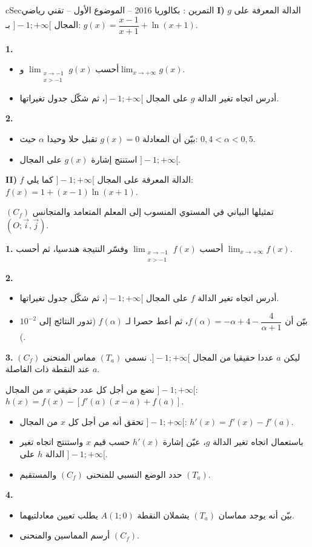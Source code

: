 \documentclass[12pt,a4paper]{article}
\newenvironment{BOX}[2]{\begin{otherlanguage}{english}\begin{arbox}{#1}{#2}}{\end{arbox}\end{otherlanguage}}
\newcounter{exo}
\newenvironment{tamrin}[1]{\stepcounter{exo}\begin{BOX}{cSec}{التمرين \theexo: #1}}{\end{BOX}}
\newenvironment{sq}{\begin{itemize}[leftmargin=2.4em,itemsep=3pt]}{\end{itemize}}
\newcommand{\qa}{\item[(أ)]}\newcommand{\qb}{\item[(ب)]}\newcommand{\qc}{\item[(جـ)]}\newcommand{\qd}{\item[(د)]}\newcommand{\qe}{\item[(هـ)]}
\newcommand{\QQ}[1]{\par\smallskip\textbf{#1.} }
\begin{document}
\begin{tamrin}{بكالوريا 2016 -- الموضوع الأول -- تقني رياضي}
\textbf{I)} $g$ الدالة المعرفة على المجال $]-1;+\infty[$ بـ: $g(x)=\dfrac{x-1}{x+1}+\ln(x+1)$.
\QQ{1}
\begin{sq}
\qa أحسب $\displaystyle\lim_{\substack{x\to-1\\x>-1}}g(x)$ و$\displaystyle\lim_{x\to+\infty}g(x)$.
\qb أدرس اتجاه تغير الدالة $g$ على المجال $]-1;+\infty[$، ثم شكّل جدول تغيراتها.
\end{sq}
\QQ{2}
\begin{sq}
\qa بيّن أن المعادلة $g(x)=0$ تقبل حلا وحيدا $\alpha$ حيث: $0{,}4<\alpha<0{,}5$.
\qb استنتج إشارة $g(x)$ على المجال $]-1;+\infty[$.
\end{sq}

\textbf{II)} $f$ الدالة المعرفة على المجال $]-1;+\infty[$ كما يلي: $f(x)=1+(x-1)\ln(x+1)$.

$(C_f)$ تمثيلها البياني في المستوي المنسوب إلى المعلم المتعامد والمتجانس $(O;\vec{i},\vec{j})$.
\QQ{1} أحسب $\displaystyle\lim_{\substack{x\to-1\\x>-1}}f(x)$ وفسّر النتيجة هندسيا، ثم أحسب $\displaystyle\lim_{x\to+\infty}f(x)$.
\QQ{2}
\begin{sq}
\qa أدرس اتجاه تغير الدالة $f$ على المجال $]-1;+\infty[$، ثم شكّل جدول تغيراتها.
\qb بيّن أن $f(\alpha)=-\alpha+4-\dfrac{4}{\alpha+1}$، ثم أعط حصرا لـ $f(\alpha)$ (تدور النتائج إلى $10^{-2}$).
\end{sq}
\QQ{3} ليكن $a$ عددا حقيقيا من المجال $]-1;+\infty[$. نسمي $(T_a)$ مماس المنحنى $(C_f)$ عند النقطة ذات الفاصلة $a$.

نضع من أجل كل عدد حقيقي $x$ من المجال $]-1;+\infty[$: $h(x)=f(x)-\left[f'(a)(x-a)+f(a)\right]$.
\begin{sq}
\qa تحقق أنه من أجل كل $x$ من المجال $]-1;+\infty[$: $h'(x)=f'(x)-f'(a)$.
\qb باستعمال اتجاه تغير الدالة $g$، عيّن إشارة $h'(x)$ حسب قيم $x$ واستنتج اتجاه تغير الدالة $h$ على $]-1;+\infty[$.
\qc حدد الوضع النسبي للمنحنى $(C_f)$ والمستقيم $(T_a)$.
\end{sq}
\QQ{4}
\begin{sq}
\qa بيّن أنه يوجد مماسان $(T_a)$ يشملان النقطة $A(1;0)$ يطلب تعيين معادلتيهما.
\qb أرسم المماسين والمنحنى $(C_f)$.
\end{sq}
\end{tamrin}
\end{document}
